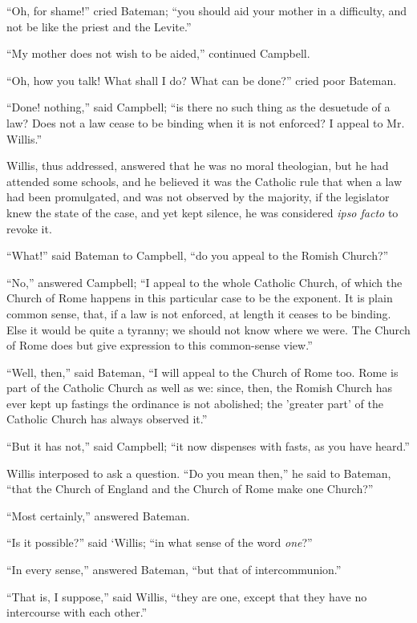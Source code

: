 ``Oh, for shame!'' cried Bateman; ``you should aid your
mother in a difficulty, and not be like the priest and the
Levite.''

``My mother does not wish to be aided,'' continued
Campbell.

``Oh, how you talk! What shall I do? What can be done?''
cried poor Bateman.

``Done! nothing,'' said Campbell; ``is there no such
thing as the desuetude of a law? Does not a law cease to be binding
when it is not enforced? I appeal to Mr. Willis.''

Willis, thus addressed, answered that he was no moral theologian,
but he had attended some schools, and he believed it was the Catholic
rule that when a law had been promulgated, and was not observed by the
majority, if the legislator knew the state of the case, and yet kept
silence, he was considered \emph{ipso facto} to revoke it.

``What!'' said Bateman to Campbell, ``do you appeal to
the Romish Church?''

``No,'' answered Campbell; ``I appeal to the whole
Catholic Church, of which the Church of Rome happens in this
particular case to be the exponent. It is plain common sense, that, if
a law is not enforced, at length it ceases to be binding. Else it
would be quite a tyranny; we should not know where we were. The Church
of Rome does but give expression to this common-sense view.''

``Well, then,'' said Bateman, ``I will appeal to the
Church of Rome too. Rome is part of the Catholic Church as well as we:
since, then, the Romish Church has ever kept up fastings the ordinance
is not abolished; the 'greater part' of the Catholic Church has always
observed it.''

``But it has not,'' said Campbell; ``it now dispenses
with fasts, as you have heard.''

Willis interposed to ask a question. ``Do you mean then,''
he said to Bateman, ``that the Church of England and the Church of
Rome make one Church?''

``Most certainly,'' answered Bateman.

``Is it possible?'' said ‘Willis; ``in what sense of
the word \emph{one}?''

``In every sense,'' answered Bateman, ``but that of
intercommunion.''

``That is, I suppose,'' said Willis, ``they are one,
except that they have no intercourse with each other.''

